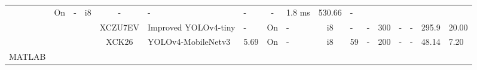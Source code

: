 \documentclass{article}
\begin{document}
\begin{table}
\begin{adjustbox}{totalheight=\baselineskip,}
\begin{tabular}{ccccclp{2em}cp{3em}cp{2em}p{4em}p{3em}p{3.5em}p{3.5em}p{2.5em}p{3em}}
                           &\multirow{1}{*}{On}
                               &\multirow{1}{*}{-}
                                   &\multirow{1}{*}{i8}
                                       &\multirow{1}{*}{-}
                                           &\multirow{1}{*}{-}
                                               &\multirow{1}{*}{-}
                                                   &\multirow{1}{*}{-}
                                                       &\multirow{1}{*}{1.8 ms}
                                                           &\multirow{1}{*}{530.66}
                                                               &\multirow{1}{*}{-}\\
\cmidrule{4-17}
   &   &   &\multirow{1}{*}{\cite{yuImprovedLightweightDeep2024}}
               &\multirow{1}{*}{XCZU7EV}
                   &\multirow{1}{*}{Improved YOLOv4-tiny}
                       &\multirow{1}{*}{-}
                           &\multirow{1}{*}{On}
                               &\multirow{1}{*}{-}
                                   &\multirow{1}{*}{i8}
                                       &\multirow{1}{*}{-}
                                           &\multirow{1}{*}{-}
                                               &\multirow{1}{*}{300}
                                                   &\multirow{1}{*}{-}
                                                       &\multirow{1}{*}{-}
                                                           &\multirow{1}{*}{295.9}
                                                               &\multirow{1}{*}{20.00}\\
\cmidrule{4-17}
   &   &   &\multirow{1}{*}{\cite{zhaoHardwareAccelerationSatellite2023a}}
               &\multirow{1}{*}{XCK26}
                   &\multirow{1}{*}{YOLOv4-MobileNetv3}
                       &\multirow{1}{*}{5.69}
                           &\multirow{1}{*}{On}
                               &\multirow{1}{*}{-}
                                   &\multirow{1}{*}{i8}
                                       &\multirow{1}{*}{59}
                                           &\multirow{1}{*}{-}
                                               &\multirow{1}{*}{200}
                                                   &\multirow{1}{*}{-}
                                                       &\multirow{1}{*}{-}
                                                           &\multirow{1}{*}{48.14}
                                                               &\multirow{1}{*}{7.20}\\
\cmidrule{1-17}
\multirow{4}{*}{MATLAB}

\end{tabular}
\end{adjustbox}
\end{table}
\end{document}
